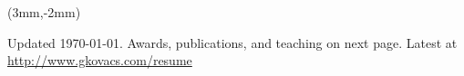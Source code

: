 \documentclass[margin,line]{resume}
\begin{document}
\vspace{-20mm}

\begin{textblock*}{17cm}(3mm,-2mm) %
\begin{small}
\begin{center}
   Updated \today. Awards, publications, and teaching on next page. Latest at \href{http://www.gkovacs.com/resume.pdf}{http://www.gkovacs.com/resume}
\end{center}
\end{small}

\end{textblock*}

\vspace{-5.0mm}

\end{document}
